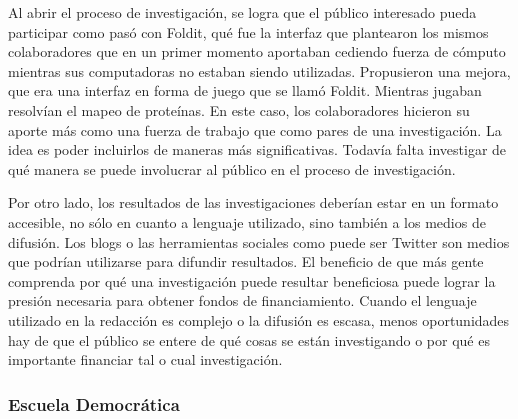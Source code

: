 	Al abrir el proceso de investigación, se logra que el público interesado pueda participar como pasó con Foldit, qué fue la interfaz que plantearon los mismos colaboradores que en un primer momento aportaban cediendo fuerza de cómputo mientras sus computadoras no estaban siendo utilizadas. Propusieron una mejora, que era una interfaz en forma de juego que se llamó Foldit. Mientras jugaban resolvían el mapeo de proteínas. En este caso, los colaboradores hicieron su aporte más como una fuerza de trabajo que como pares de una investigación. La idea es poder incluirlos de maneras más significativas. Todavía falta investigar de qué manera se puede involucrar al público en el proceso de investigación.
	
	Por otro lado, los resultados de las investigaciones deberían estar en un formato accesible, no sólo en cuanto a lenguaje utilizado, sino también a los medios de difusión. Los blogs o las herramientas sociales como puede ser Twitter son medios que podrían utilizarse para difundir resultados. El beneficio de que más gente comprenda por qué una investigación puede resultar beneficiosa puede lograr la presión necesaria para obtener fondos de financiamiento. Cuando el lenguaje utilizado en la redacción es complejo o la difusión es escasa, menos oportunidades hay de que el público se entere de qué cosas se están investigando o por qué es importante financiar tal o cual investigación.
	
\subsubsection{Escuela Democrática}	
	
